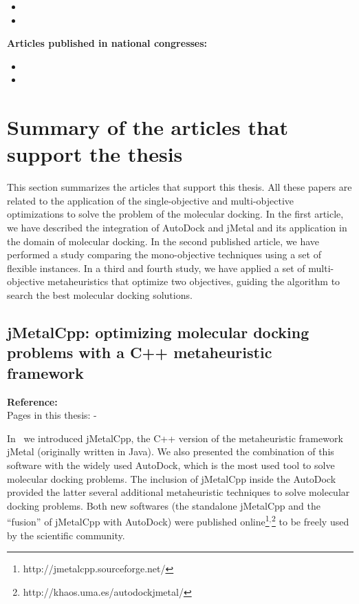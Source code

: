 \begin{itemize}[leftmargin=5.5mm]
	
	\item {}
	
	\item {}

\end{itemize}

\noindent \textbf{Articles published in national congresses:}

\begin{itemize}[leftmargin=5.5mm]
	
	\item {}
	
	\item {}  

\end{itemize}

\section{Summary of the articles that support the thesis}
\label{sec:Summary_articles_support}

This section summarizes the articles that support this thesis. All these papers are related to the application of the single-objective and multi-objective optimizations to solve the problem of the molecular docking. In the first article, we have described the integration of AutoDock and jMetal and its application in the domain of molecular docking. In the second published article, we have performed a study comparing the mono-objective techniques using a set of flexible instances. In a third and fourth study, we have applied a set of multi-objective metaheuristics that optimize two objectives, guiding the algorithm to search the best molecular docking solutions.

\subsection{jMetalCpp: optimizing molecular docking problems with a C++ metaheuristic framework}

\textbf{Reference:}~\cite{lopez14jmetalcpp} \\
Pages in this thesis: \pageref{start-pdf/bioinformatics.pdf}-\pageref{stop-pdf/bioinformatics.pdf}

In~\cite{lopez14jmetalcpp} we introduced jMetalCpp, the C++ version of the metaheuristic framework jMetal (originally written in Java). We also presented the combination of this software with the widely used AutoDock, which is the most used tool to solve molecular docking problems. The inclusion of jMetalCpp inside the AutoDock provided the latter several additional metaheuristic techniques to solve molecular docking problems. Both new softwares (the standalone jMetalCpp and the ``fusion'' of jMetalCpp with AutoDock) were published online\footnote{http://jmetalcpp.sourceforge.net/}$^{,}$\footnote{http://khaos.uma.es/autodockjmetal/} to be freely used by the scientific community.

